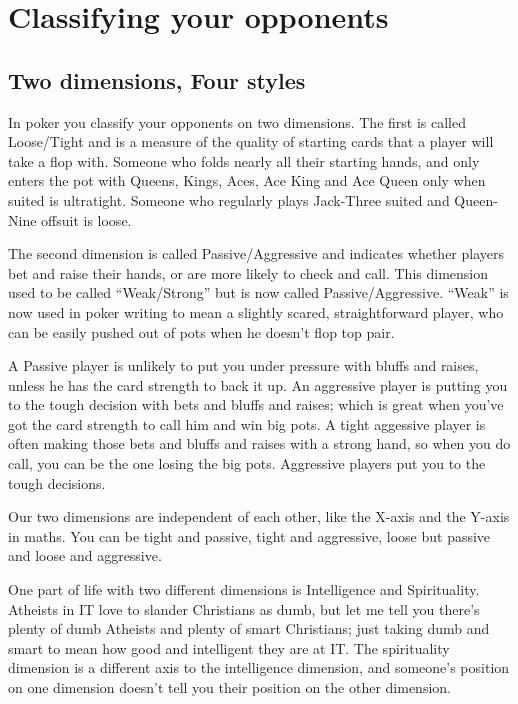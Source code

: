 \chapter{Classifying your opponents}


\section{Two dimensions, Four styles}

In poker you classify your opponents on two dimensions.
The first is called Loose/Tight and is a measure of the quality
of starting cards that a player will take a flop with. Someone
who folds nearly all their starting hands, and
only enters the pot with Queens, Kings, Aces, Ace King and
Ace Queen only when suited is ultratight. Someone who regularly plays
Jack-Three suited and Queen-Nine offsuit is loose.

The second dimension is called Passive/Aggressive and indicates
whether players bet and raise their hands, or are more likely
to check and call. This dimension used to be called ``Weak/Strong''
but is now called Passive/Aggressive. ``Weak'' is now used in poker
writing to mean a slightly scared, straightforward player, who can be
easily pushed out of pots when he doesn't flop top pair.

A Passive player is unlikely to put you under pressure with bluffs and
raises, unless he has the card strength to back it up. An aggressive
player is putting you to the tough decision with bets and bluffs and
raises; which is great when you've got the card strength to call him
and win big pots. A tight aggessive player is often making those bets and
bluffs and raises with a strong hand, so when you do call, you can be
the one losing the big pots. Aggressive players put you to the tough
decisions.

Our two dimensions are independent of each other, like the X-axis
and the Y-axis in maths. You can be tight and passive, tight
and aggressive, loose but passive and loose and aggressive.

One part of life with two different dimensions is Intelligence and
Spirituality. Atheists in IT love to slander Christians as dumb,
but let me tell you there's plenty of dumb Atheists and plenty of
smart Christians; just taking dumb and smart to mean how good and
intelligent they are at IT. The spirituality dimension is a different
axis to the intelligence dimension, and someone's position on one
dimension doesn't tell you their position on the other dimension.

